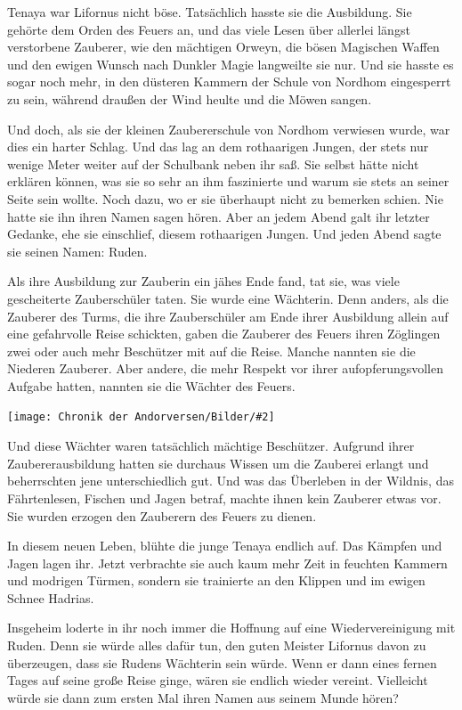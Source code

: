 \documentclass[10pt, a4paper, oneside]{book}
\newcommand{\bildmitts}[2][height=0.32\textwidth,width=0.48\textwidth,keepaspectratio]{%
    \begin{center}
        \texttt{[image: Chronik der Andorversen/Bilder/\#2]}
    \end{center}
}
\begin{document}
\begin{multicols}{2}
Tenaya war Lifornus nicht böse. Tatsächlich hasste sie die Ausbildung. Sie gehörte dem Orden des Feuers an, und das viele Lesen über allerlei längst verstorbene Zauberer, wie den mächtigen Orweyn, die bösen Magischen Waffen und den ewigen Wunsch nach Dunkler Magie langweilte sie nur. Und sie hasste es sogar noch mehr, in den düsteren Kammern der Schule von Nordhom eingesperrt zu sein, während draußen der Wind heulte und die Möwen sangen.

Und doch, als sie der kleinen Zaubererschule von Nordhom verwiesen wurde, war dies ein harter Schlag. Und das lag an dem rothaarigen Jungen, der stets nur wenige Meter weiter auf der Schulbank neben ihr saß. Sie selbst hätte nicht erklären können, was sie so sehr an ihm faszinierte und warum sie stets an seiner Seite sein wollte. Noch dazu, wo er sie überhaupt nicht zu bemerken schien. Nie hatte sie ihn ihren Namen sagen hören. Aber an jedem Abend galt ihr letzter Gedanke, ehe sie einschlief, diesem rothaarigen Jungen. Und jeden Abend sagte sie seinen Namen: Ruden.

Als ihre Ausbildung zur Zauberin ein jähes Ende fand, tat sie, was viele gescheiterte Zauberschüler taten. Sie wurde eine Wächterin. Denn anders, als die Zauberer des Turms, die ihre Zauberschüler am Ende ihrer Ausbildung allein auf eine gefahrvolle Reise schickten, gaben die Zauberer des Feuers ihren Zöglingen zwei oder auch mehr Beschützer mit auf die Reise. Manche nannten sie die Niederen Zauberer. Aber andere, die mehr Respekt vor ihrer aufopferungsvollen Aufgabe hatten, nannten sie die Wächter des Feuers.

\bildmitts{Tenaya die Wächterin des Feuers Bild 1.jpg} 

Und diese Wächter waren tatsächlich mächtige Beschützer. Aufgrund ihrer Zaubererausbildung hatten sie durchaus Wissen um die Zauberei erlangt und beherrschten jene unterschiedlich gut. Und was das Überleben in der Wildnis, das Fährtenlesen, Fischen und Jagen betraf, machte ihnen kein Zauberer etwas vor. Sie wurden erzogen den Zauberern des Feuers zu dienen.

In diesem neuen Leben, blühte die junge Tenaya endlich auf. Das Kämpfen und Jagen lagen ihr. Jetzt verbrachte sie auch kaum mehr Zeit in feuchten Kammern und modrigen Türmen, sondern sie trainierte an den Klippen und im ewigen Schnee Hadrias.

Insgeheim loderte in ihr noch immer die Hoffnung auf eine Wiedervereinigung mit Ruden. Denn sie würde alles dafür tun, den guten Meister Lifornus davon zu überzeugen, dass sie Rudens Wächterin sein würde. Wenn er dann eines fernen Tages auf seine große Reise ginge, wären sie endlich wieder vereint. Vielleicht würde sie dann zum ersten Mal ihren Namen aus seinem Munde hören?


\end{multicols}
\end{document}
